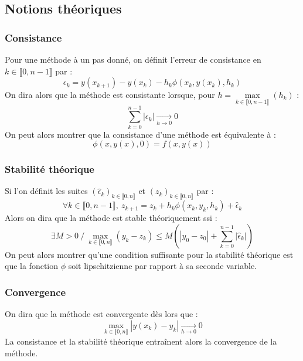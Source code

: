 \documentclass[a4paper, titlepage]{livret} %
\begin{document}
			\subsection{Notions théoriques}
				\subsubsection{Consistance}
					Pour une méthode à un pas donné, on définit l'erreur de consistance en $k \in \llbracket 0, n-1 \rrbracket$ par :
					\[
						\epsilon_{k} = y(x_{k+1}) - y(x_{k}) - h_{k}\phi(x_{k}, y(x_{k}), h_{k})
					\] 
					On dira alors que la méthode est consistante lorsque, pour $h = \max\limits_{k \in \llbracket 0, n-1 \rrbracket}{(h_{k})}$ :
					\[
						\sum_{k = 0}^{n-1} |\epsilon_{k}| \underset{h \to 0}{\longrightarrow} 0
					\]				
					On peut alors montrer que la consistance d'une méthode est équivalente à :
					\[
						\phi(x, y(x), 0) = f(x, y(x)) 
					\]

				\subsubsection{Stabilité théorique}
					Si l'on définit les suites $(\hat{\epsilon}_{k})_{k \in \llbracket 0, n \rrbracket}$ et $(z_{k})_{k \in \llbracket 0, n \rrbracket}$ par : 
					\[
						\forall k \in \llbracket 0, n-1 \rrbracket, \ z_{k+1} = z_{k} + h_{k}\phi(x_{k}, y_{k}, h_{k}) + \hat{\epsilon}_{k}  
					\]
					Alors on dira que la méthode est stable théoriquement ssi :
					\[
						\exists M > 0 \ / \ \max\limits_{k \in \llbracket 0, n \rrbracket}{(y_{k} - z_{k})} \leq M(|y_{0} - z_{0}| + \sum_{k = 0}^{n-1} |\hat{\epsilon}_{k}|)  
					\]
					On peut alors montrer qu'une condition suffisante pour la stabilité théorique est que la fonction $\phi$ soit lipschitzienne par rapport à sa seconde variable.

				\subsubsection{Convergence}
					On dira que la méthode est convergente dès lors que :
					\[
						\max\limits_{k \in \llbracket 0, n \rrbracket}{|y(x_{k}) - y_{k}|} \underset{h \to 0}{\longrightarrow} 0
					\]
					La consistance et la stabilité théorique entraînent alors la convergence de la méthode.
\end{document}
